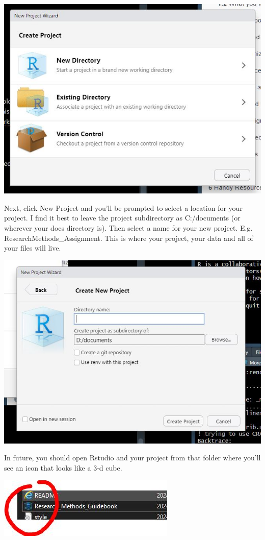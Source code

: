 \documentclass[
]{html}
\theoremstyle{definition}
\theoremstyle{definition}
\theoremstyle{definition}
\theoremstyle{definition}
\theoremstyle{remark}
\begin{document}
\includegraphics{images/NewProject.JPG}

Next, click New Project and you'll be prompted to select a location for your project. I find it best to leave the project subdirectory as C:/documents (or wherever your docs directory is). Then select a name for your new project. E.g. ResearchMethods\_Assignment. This is where your project, your data and all of your files will live.

\includegraphics{images/NewProject_name.JPG}

In future, you should open Rstudio and your project from that folder where you'll see an icon that looks like a 3-d cube.

\includegraphics{images/projecticon.JPG}
\end{document}
